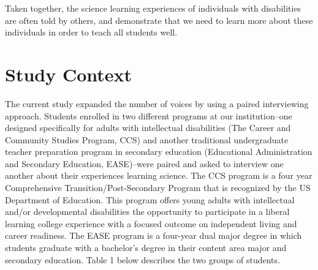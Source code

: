 \documentclass[11pt]{sig-alternate}
\begin{document}
\begin{large}
Taken together, the science learning experiences of individuals with disabilities are often told by others, and demonstrate that we need to learn more about these individuals in order to teach all students well. 

\section*{Study Context}
The current study expanded the number of voices by using a paired interviewing approach. Students enrolled in two different programs at our institution--one designed specifically for adults with intellectual disabilities (The Career and Community Studies Program, CCS) and another traditional undergraduate teacher preparation program in secondary education (Educational Administration and Secondary Education, EASE)--were paired and asked to interview one another about their experiences learning science. The CCS program is a four year Comprehensive Transition/Post-Secondary Program that is recognized by the US Department of Education. This program offers young adults with intellectual and/or developmental disabilities the opportunity to participate in a liberal learning college experience with a focused outcome on independent living and career readiness. The EASE program is a four-year dual major degree in which students graduate with a bachelor’s degree in their content area major and secondary education. Table 1 below describes the two groups of students.



\end{large}
\end{document}
